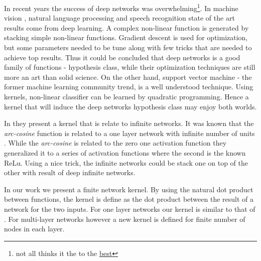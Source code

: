 In recent years the success of deep networks was overwhelming\footnote{not all thinks it the to the \href{https://www.linkedin.com/pulse/computer-vision-research-my-deep-depression-nikos-paragios?trk=hp-feed-article-title-like}{best}}.
In machine vision \cite{krizhevsky2012imagenet}, natural language processing \cite{mikolov2013efficient} and speech recognition \cite{mohamed2009deep, hinton2012deep} state of the art results come from deep learning.
A complex non-linear function is generated by stacking simple non-linear functions.
Gradient descent is used for optimization, but some parameters needed to be tune along with few tricks that are needed to achieve top results.
Thus it could be concluded that deep networks is a good family of functions - hypothesis class, while their optimization techniques are still more an art than solid science.
On the other hand, support vector machine - the former machine learning community trend, is a well understood technique.
Using kernels, non-linear classifier can be learned by quadratic programming\cite{scholkopf2002learning}.
Hence a kernel that will induce the deep networks hypothesis class may enjoy both worlds.

In \cite{cho2009kernel} they present a kernel that is relate to infinite networks.
It was known that the \textit{arc-cosine} function is related to a one layer network with infinite number of units \cite{williams1998computation}.
While the \textit{arc-cosine} is related to the zero one activation function they generalized it to a series of activation functions where the second is the known ReLu.
Using a nice trick, the infinite networks could be stack one on top of the other with result of deep infinite networks.

In our work \cite{heinemann2016improper} we present a finite network kernel.
By using the natural dot product between functions, the kernel is define as the dot product between the result of a network for the two inputs.
For one layer networks our kernel is similar to that of \cite{cho2009kernel}.
For multi-layer networks however a new kernel is defined for finite number of nodes in each layer.

